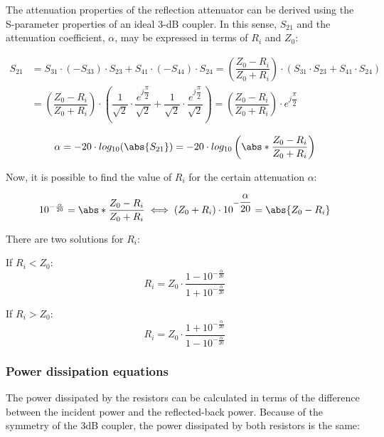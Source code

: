 \noindent The attenuation properties of the reflection attenuator can be derived using the S-parameter properties of an ideal 3-dB coupler. In this sense, $S_{21}$ and the attenuation coefficient, $\alpha$, may be expressed in terms of $R_i$ and $Z_0$:


\begin{align}
S_{21} & = S_{31} \cdot (-S_{33}) \cdot S_{23} + S_{41} \cdot (-S_{44}) \cdot S_{24} = \left( \dfrac{Z_0 - R_i}{Z_0 + R_i} \right) \cdot (S_{31} \cdot S_{23} + S_{41} \cdot S_{24}) \\
 & = \left( \dfrac{Z_0 - R_i}{Z_0 + R_i} \right) \cdot \left( \dfrac{1}{\sqrt{2}} \cdot \dfrac{e^{j \dfrac{\pi}{2}}}{\sqrt{2}} + \dfrac{1}{\sqrt{2}} \cdot \dfrac{e^{j \dfrac{\pi}{2}}}{\sqrt{2}} \right) = \left( \dfrac{Z_{0} - R_{i}}{Z_{0} + R_{i}}\right) \cdot e^{j\dfrac{\pi}{2}}
\end{align}


\begin{equation}
\alpha = -20\cdot log_{10} (\abs{S_{21}}) = -20\cdot log_{10} \left(\abs*{\dfrac{Z_0 - R_i}{Z_0 + R_i}} \right)
\end{equation}

\noindent Now, it is possible to find the value of $R_{i}$ for the certain attenuation $\alpha$:

\begin{equation}
10^{-\frac{\alpha}{20}} = \abs*{\dfrac{Z_0 - R_i}{Z_0 + R_i}} \iff (Z_0 + R_i) \cdot 10^{-\dfrac{\alpha}{20}} = \abs{Z_{0} - R_i}
\end{equation}

\noindent There are two solutions for $R_i$:
\bigskip

\noindent If $R_i < Z_0$:
\begin{equation}
R_i = Z_0 \cdot \dfrac{1 - 10^{-\frac{\alpha}{20}}}{1 + 10^{-\frac{\alpha}{20}}}
\end{equation}

\noindent If $R_i > Z_0$:
\begin{equation}
R_i = Z_0 \cdot \dfrac{1 + 10^{-\frac{\alpha}{20}}}{1 - 10^{-\frac{\alpha}{20}}}
\end{equation}

\subsubsection{Power dissipation equations}

The power dissipated by the resistors can be calculated in terms of the difference between the incident power and the reflected-back power.
Because of the symmetry of the 3dB coupler, the power dissipated by both resistors is the same:

